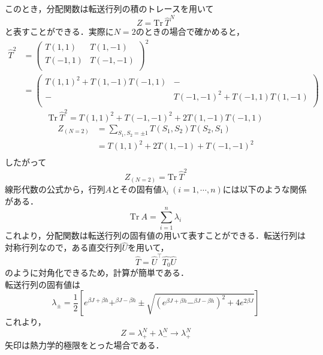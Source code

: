 \documentclass[a4paper,11pt]{jsarticle}
\begin{document}
このとき，分配関数は転送行列の積のトレースを用いて
\begin{equation*}
  Z = \text{Tr} \  \hat{T}^N
\end{equation*}
と表すことができる．実際に$N=2$のときの場合で確かめると，
\begin{align*}
  \hat{T}^2 &= 
  \begin{pmatrix}
    T(1,1) & T(1,-1) \\
    T(-1,1) & T(-1,-1) \\
  \end{pmatrix}^2\\
  &=
  \begin{pmatrix}
    T(1,1)^2 + T(1,-1)T(-1,1) & - \\
    - & T(-1,-1)^2 + T(-1,1)T(1,-1) \\
  \end{pmatrix}
\end{align*}
\begin{equation*}
  \text{Tr} \ \hat{T}^2 = T(1,1)^2 + T(-1,-1)^2 + 2T(1,-1)T(-1,1)
\end{equation*}
\begin{align*}
  Z_{(N=2)} 
  &= \sum_{S_1, S_2 = \pm 1} T(S_1, S_2) T(S_2, S_1)\\
  &= T(1,1)^2 + 2T(1,-1) + T(-1,-1)^2\\ 
\end{align*}
したがって
\begin{equation*}
   Z_{(N=2)} = \text{Tr} \ \hat{T}^2
\end{equation*}
線形代数の公式から，行列$A$とその固有値$\lambda_i \ (i=1,\cdots,n)$には以下のような関係がある．
\begin{equation*}
  \text{Tr} \ A = \sum_{i=1}^{n} \lambda_i
\end{equation*}
これより，分配関数は転送行列の固有値の用いて表すことができる．転送行列は対称行列なので，ある直交行列$\hat{U}$を用いて，
\begin{equation*}
  \hat{T} = \hat{U}^{\top} \hat{T_0} \hat{U}
\end{equation*}
のように対角化できるため，計算が簡単である．\\

転送行列の固有値は
\begin{equation*}
  \lambda_{\pm} = \frac{1}{2}\left[ e^{\beta J + \beta h} + ^{\beta J - \beta h} \pm \sqrt{(e^{\beta J + \beta h} - ^{\beta J - \beta h})^2 + 4e^{2\beta J}} \right]
\end{equation*}
これより，
\begin{equation*}
  Z = \lambda_+^N + \lambda_-^N \rightarrow \lambda_+^N
\end{equation*}
矢印は熱力学的極限をとった場合である．
\end{document}
